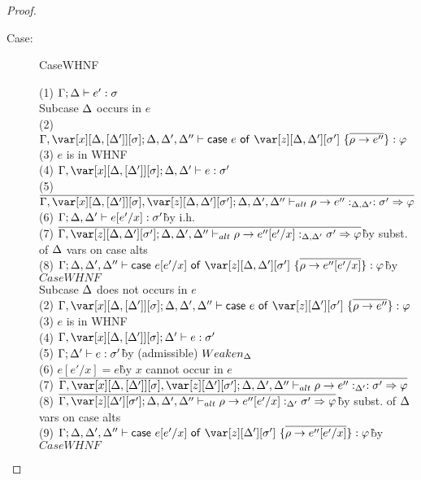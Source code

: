 \begin{proof}
\begin{description}
\item[Case:] CaseWHNF
\begin{tabbing}
    (1) $\Gamma; \Delta \vdash e' : \sigma$\\
    Subcase $\Delta$ occurs in $e$\\
    (2) $\G,\xD;\D,\D',\D'' \vdash \ccase{e}{\z[\D,\D'][\s']~\{\ov{\rho \to e''}\}} : \vp$\\
    (3) $e$ is in WHNF\\
    (4) $\G,\xD;\D,\D' \vdash e : \s'$\\
    (5) $\ov{\G,\xD,\z[\D,\D'][\s']; \D,\D',\D'' \vdash_{alt} \rho \to e'' :_{\D,\D'} : \s' \Rightarrow \vp}$\\
    (6) $\Gamma;\Delta,\Delta' \vdash e[e'/x] : \sigma'$\` by i.h.\\
    (7) $\ov{\G,\z[\D,\D'][\s']; \D,\D',\D'' \vdash_{alt} \rho \to e''[e'/x] :_{\D,\D'} \s' \Rightarrow \vp}$\` by subst. of $\Delta$ vars on case alts\\
    (8) $\G;\D,\D',\D'' \vdash \ccase{e[e'/x]}{\z[\D,\D'][\s']~\{\ov{\rho \to e''[e'/x]}\}} : \vp$\` by $CaseWHNF$\\
    Subcase $\Delta$ does not occurs in $e$\\
    (2) $\G,\xD;\D,\D',\D'' \vdash \ccase{e}{\z[\D'][\s']~\{\ov{\rho \to e''}\}} : \vp$\\
    (3) $e$ is in WHNF\\
    (4) $\G,\xD;\D' \vdash e : \s'$\\
    (5) $\Gamma;\Delta' \vdash e : \sigma'$\` by (admissible) $Weaken_\Delta$\\
    (6) $e[e'/x] = e$\` by $x$ cannot occur in $e$\\
    (7) $\ov{\G,\xD,\z[\D'][\s']; \D,\D',\D'' \vdash_{alt} \rho \to e'' :_{\D'} : \s' \Rightarrow \vp}$\\
    (8) $\ov{\G,\z[\D'][\s']; \D,\D',\D'' \vdash_{alt} \rho \to e''[e'/x] :_{\D'} \s' \Rightarrow \vp}$\` by subst. of $\Delta$ vars on case alts\\
    (9) $\G;\D,\D',\D'' \vdash \ccase{e[e'/x]}{\z[\D'][\s']~\{\ov{\rho \to e''[e'/x]}\}} : \vp$\` by $CaseWHNF$\\
\end{tabbing}


\end{description}
\end{proof}
